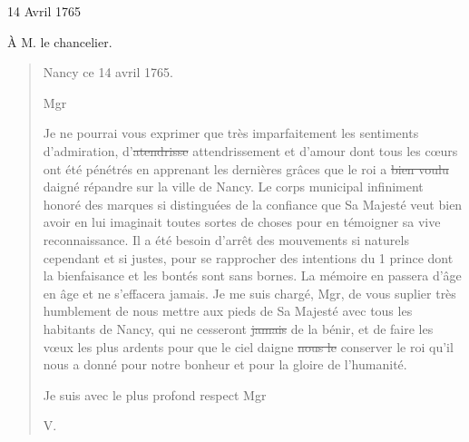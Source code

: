                      \begin{diary}{14 Avril 1765}{}

                         À M. le
                              chancelier. \bigskip


                        \begin{quote}\begin{flushright}
                                 Nancy ce 14 avril 1765. \end{flushright}\bigskip


                                 Mgr \bigskip


                              Je ne pourrai vous exprimer que très imparfaitement
                              les sentiments d'admiration, d'\sout{atendrisse} attendrissement et
                              d'amour dont tous les cœurs ont été pénétrés
                              en apprenant les dernières grâces que le roi
                              a \sout{bien voulu}
                              daigné répandre sur la ville de Nancy.
                              Le corps municipal infiniment honoré des
                              marques si distinguées de la confiance
                              que
                              Sa Majesté veut bien avoir en lui imaginait
                              toutes sortes de choses pour en témoigner sa
                              vive reconnaissance. Il a été besoin d'arrêt
                              des mouvements si naturels cependant et si justes, pour
                              se rapprocher des intentions du 1 prince dont
                              la bienfaisance et les bontés sont sans bornes.
                              La mémoire en passera d'âge en âge et
                              ne
                              s'effacera jamais. Je me suis chargé, Mgr,
                              de vous suplier très humblement de nous mettre aux pieds de Sa Majesté avec tous les
                              habitants de Nancy, qui ne
                              cesseront
                              \sout{jamais} de la bénir, et de faire
                              les vœux
                              les plus ardents pour que le ciel daigne
                              \sout{nous le} conserver le roi qu'il nous a
                              donné pour notre bonheur et pour la
                              gloire
                              de l'humanité. \bigskip

         Je suis avec le plus profond respect
                                 Mgr \begin{flushright}
                                 V.
                              \end{flushright}\end{quote}
                     \end{diary}


